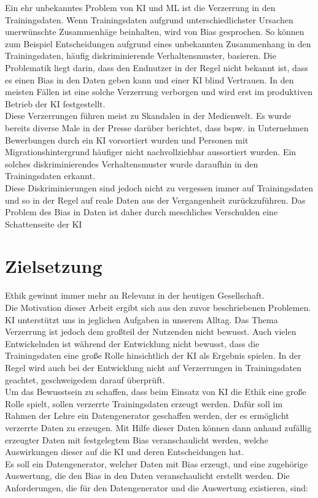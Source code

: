 \begin{onehalfspace}
        Ein ehr unbekanntes Problem von \ac*{KI} und \ac*{ML} ist die Verzerrung in den Trainingsdaten. Wenn Trainingsdaten aufgrund unterschiedlichster Ursachen unerwünschte Zusammenhäge beinhalten, wird von Bias gesprochen. So können zum Beispiel Entscheidungen aufgrund eines unbekannten Zusammenhang in den Trainingsdaten, häufig diskriminierende Verhaltensmuster, basieren. Die Problematik liegt darin, dass den Endnutzer in der Regel nicht bekannt ist, dass es einen Bias in den Daten geben kann und einer \ac*{KI} blind Vertrauen. In den meisten Fällen ist eine solche Verzerrung verborgen und wird erst im produktiven Betrieb der \ac*{KI} festgestellt.
        \\
        Diese Verzerrungen führen meist zu Skandalen in der Medienwelt. Es wurde bereits diverse Male in der Presse darüber berichtet, dass bspw. in Unternehmen Bewerbungen durch ein \ac*{KI} vorsortiert wurden und Personen mit Migrationshintergrund häufiger nicht nachvollziehbar aussortiert wurden. Ein solches diskriminierendes Verhaltensmuster wurde daraufhin in den Trainingsdaten erkannt.
        \\
        Diese Diskriminierungen sind jedoch nicht zu vergessen immer auf Trainingsdaten und so in der Regel auf reale Daten aus der Vergangenheit zurückzuführen. Das Problem des Bias in Daten ist daher durch meschliches Verschulden eine Schattenseite der \ac*{KI} 

        \newpage
        \section{Zielsetzung}
        \label{subsec:zielsetzung}
        Ethik gewinnt immer mehr an Relevanz in der heutigen Gesellschaft. 
        \\
        Die Motivation dieser Arbeit ergibt sich aus den zuvor beschriebenen Problemen. \ac*{KI} unterstützt uns in jeglichen Aufgaben in unserem Alltag. Das Thema Verzerrung ist jedoch dem großteil der Nutzenden nicht bewusst. Auch vielen Entwickelnden ist während der Entwicklung nicht bewusst, dass die Trainingsdaten eine große Rolle hinsichtlich der \ac*{KI} als Ergebnis spielen. In der Regel wird auch bei der Entwicklung nicht auf Verzerrungen in Trainingsdaten geachtet, geschweigedem darauf überprüft. 
        \\
        Um das Bewusstsein zu schaffen, dass beim Einsatz von \ac*{KI} die Ethik eine große Rolle spielt, sollen verzerrte Trainingsdaten erzeugt werden. Dafür soll im Rahmen der Lehre ein Datengenerator geschaffen werden, der es ermöglicht verzerrte Daten zu erzeugen. Mit Hilfe dieser Daten können dann anhand zufällig erzeugter Daten mit festgelegtem Bias veranschaulicht werden, welche Auswirkungen dieser auf die \ac*{KI} und deren Entscheidungen hat. 
        \\
        Es soll ein Datengenerator, welcher Daten mit Bias erzeugt, und eine zugehörige Auswertung, die den Bias in den Daten veranschaulicht erstellt werden. Die Anforderungen, die für den Datengenerator und die Auswertung existieren, sind:
        

\end{onehalfspace}
